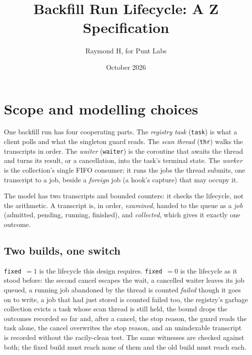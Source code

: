 \documentclass[a4paper,10pt,fleqn]{article}
\newcommand{\field}[1]{\texttt{#1}}
\begin{document}
\title{Backfill Run Lifecycle: A Z Specification}
\author{Raymond H, for Punt Labs}
\date{October 2026}
\maketitle

\section{Scope and modelling choices}
\label{sec:scope}

One backfill run has four cooperating parts. The \emph{registry task}
(\field{task}) is what a client polls and what the singleton guard reads. The
\emph{scan thread} (\field{thr}) walks the transcripts in order. The
\emph{waiter} (\field{waiter}) is the coroutine that awaits the thread and
turns its result, or a cancellation, into the task's terminal state. The
\emph{worker} is the collection's single FIFO consumer; it runs the jobs the
thread submits, one transcript to a job, beside a \emph{foreign} job (a hook's
capture) that may occupy it.

The model has two transcripts and bounded counters: it checks the lifecycle,
not the arithmetic. A transcript is, in order, \emph{examined}, handed to the
queue as a \emph{job} (admitted, pending, running, finished), and
\emph{collected}, which gives it exactly one outcome.

\subsection{Two builds, one switch}

\field{fixed}~$=1$ is the lifecycle this design requires. \field{fixed}~$=0$ is
the lifecycle as it stood before: the second cancel escapes the wait, a
cancelled waiter leaves its job queued, a running job abandoned by the thread is
counted \emph{failed} though it goes on to write, a job that had just stored is
counted failed too, the registry's garbage collection evicts a task whose scan
thread is still held, the bound drops the outcomes recorded so far and, after a
cancel, the stop reason, the guard reads the task alone, the cancel overwrites
the stop reason, and an unindexable transcript is recorded without the
racily-clean test. The same witnesses are checked against both; the
fixed build must reach none of them and the old build must reach each.
\end{document}
